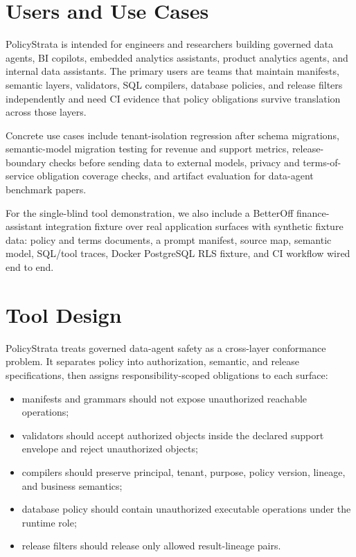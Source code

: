 \documentclass[sigconf]{acmart}
\begin{document}
\section{Users and Use Cases}

PolicyStrata is intended for engineers and researchers building governed data agents, BI copilots, embedded analytics assistants, product analytics agents, and internal data assistants. The primary users are teams that maintain manifests, semantic layers, validators, SQL compilers, database policies, and release filters independently and need CI evidence that policy obligations survive translation across those layers.

Concrete use cases include tenant-isolation regression after schema migrations, semantic-model migration testing for revenue and support metrics, release-boundary checks before sending data to external models, privacy and terms-of-service obligation coverage checks, and artifact evaluation for data-agent benchmark papers.

For the single-blind tool demonstration, we also include a BetterOff finance-assistant integration fixture over real application surfaces with synthetic fixture data: policy and terms documents, a prompt manifest, source map, semantic model, SQL/tool traces, Docker PostgreSQL RLS fixture, and CI workflow wired end to end.

\section{Tool Design}

PolicyStrata treats governed data-agent safety as a cross-layer conformance problem. It separates policy into authorization, semantic, and release specifications, then assigns responsibility-scoped obligations to each surface:

\begin{itemize}
  \item manifests and grammars should not expose unauthorized reachable operations;
  \item validators should accept authorized objects inside the declared support envelope and reject unauthorized objects;
  \item compilers should preserve principal, tenant, purpose, policy version, lineage, and business semantics;
  \item database policy should contain unauthorized executable operations under the runtime role;
  \item release filters should release only allowed result-lineage pairs.
\end{itemize}
\end{document}
